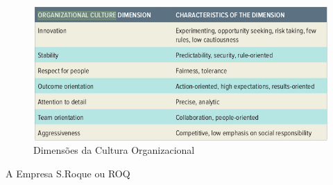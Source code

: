 \begin{figure}[H]
	\flushleft
	\captionsetup{justification=raggedright,singlelinecheck=false}
	\includegraphics[scale=0.4]{./image/CORGA/OB/OC_Dimensions.jpg}
	\caption{Dimensões da Cultura Organizacional}
\end{figure}\par
\qquad A Empresa S.Roque ou ROQ \\
